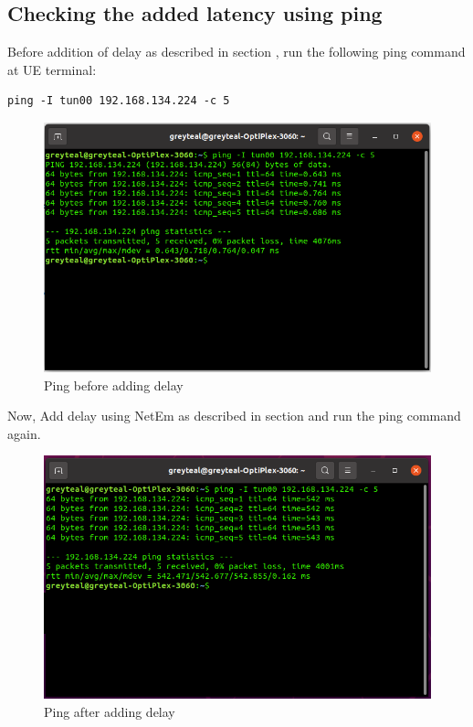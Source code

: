 \subsection{Checking the added latency using ping}
Before addition of delay as described in section , run the following ping command at UE terminal:
\begin{lstlisting}
ping -I tun00 192.168.134.224 -c 5
\end{lstlisting}
\begin{figure}[h!]
\centering
\includegraphics[width=0.7\columnwidth]{./Figures/Ping_before_adding_delay.png}
\caption{Ping before adding delay}
\label{Ping_before_adding_delay}
\end{figure}
Now, Add delay using NetEm as described in section  and run the ping command again.
\begin{figure}[h!]
\centering
\includegraphics[width=0.7\columnwidth]{./Figures/Ping_after_adding_delay.png}
\caption{Ping after adding delay}
\label{Ping_after_adding_delay}
\end{figure}

